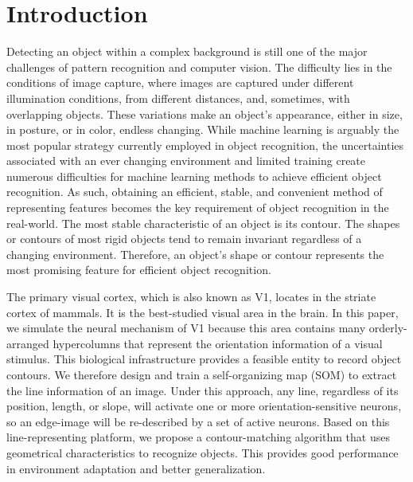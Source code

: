\documentclass{article}
\begin{document}

\section{Introduction}


Detecting %
an object within a complex background is still one of the major challenges of pattern recognition and computer vision. 
The difficulty lies in the conditions of image capture,
where images are captured under different illumination conditions, 
from different distances, and, sometimes, with overlapping objects.
These variations make an object's appearance, either in size, in posture, or in color, endless changing. 
While machine learning is arguably the most popular strategy currently employed in object recognition, 
the uncertainties associated with an ever changing environment and limited training create numerous difficulties for machine learning methods to achieve efficient object recognition. 
As such, obtaining an efficient, stable, and convenient method of representing features becomes the key requirement of object recognition in the real-world. 
The most stable characteristic of an object is its contour. 
The shapes or contours of most rigid objects tend to remain invariant regardless of a changing environment. 
Therefore, an object's shape or contour represents the most promising feature for efficient object recognition.


The primary visual cortex, which is also known as V1, locates in the striate cortex of mammals.
It is the best-studied visual area in the brain.
In this paper, we simulate the neural mechanism of V1 because this area contains many orderly-arranged hypercolumns that represent the orientation information of a visual stimulus.
This biological infrastructure provides a feasible entity to record object contours. 
We therefore design and train a self-organizing map (SOM) to extract the line information of an image. 
Under this approach, any line, regardless of its position, length, or slope, 
will activate one or more orientation-sensitive neurons, 
so an edge-image will be re-described by a set of active neurons. 
Based on this line-representing platform, 
we propose a contour-matching algorithm that uses geometrical characteristics to recognize objects. 
This provides good performance in environment adaptation and better generalization.
\end{document}
